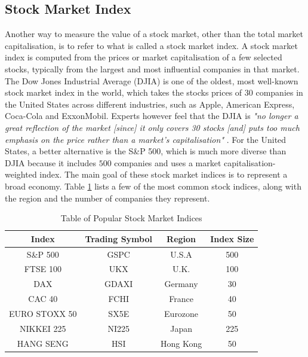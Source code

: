 \documentclass{UoYCSproject}
\begin{document}
\subsection{Stock Market Index}
Another way to measure the value of a stock market, other than the total market capitalisation, is to refer to what is called a stock market index. A stock market index is computed from the prices or market capitalisation of a few selected stocks, typically from the largest and most influential companies in that market. The Dow Jones Industrial Average (DJIA) is one of the oldest, most well-known stock market index in the world, which takes the stocks prices of 30 companies in the United States across different industries, such as Apple, American Express, Coca-Cola and ExxonMobil. Experts however feel that the DJIA is \textit{"no longer a great reflection of the market [since] it only covers 30 stocks [and] puts too much emphasis on the price rather than a market's capitalisation"} \cite{dowproblem}. For the United States, a better alternative is the S\&P 500, which is much more diverse than DJIA because it includes $500$ companies and uses a market capitalisation-weighted index. The main goal of these stock market indices is to represent a broad economy. Table \ref{tab:indices} lists a few of the most common stock indices, along with the region and the number of companies they represent. 

\begin{table}[h]
    \centering
    \begin{tabular}{|c|c|c|c|} \hline
        \textbf{Index} & \textbf{Trading Symbol} & \textbf{Region} & \textbf{Index Size} \\ \hline
        S\&P 500 & GSPC & U.S.A & 500 \\
        FTSE 100 & UKX & U.K. & 100 \\
        DAX & GDAXI & Germany & 30 \\
        CAC 40 & FCHI & France & 40 \\
        EURO STOXX 50 & SX5E & Eurozone & 50 \\
        NIKKEI 225 & NI225 & Japan & 225 \\
        HANG SENG & HSI & Hong Kong & 50 \\
        \hline
    \end{tabular}
    \caption{Table of Popular Stock Market Indices}
    \label{tab:indices}
\end{table}
\end{document}
